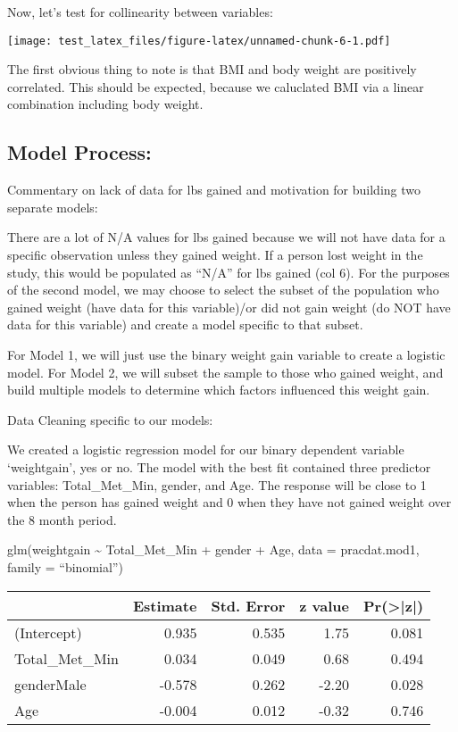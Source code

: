 \documentclass[]{article}
\begin{document}
Now, let's test for collinearity between variables:

\texttt{[image: test\_latex\_files/figure-latex/unnamed-chunk-6-1.pdf]}

The first obvious thing to note is that BMI and body weight are
positively correlated. This should be expected, because we caluclated
BMI via a linear combination including body weight.

\hypertarget{model-process}{%
\subsection{Model Process:}\label{model-process}}

Commentary on lack of data for lbs gained and motivation for building
two separate models:

There are a lot of N/A values for lbs gained because we will not have
data for a specific observation unless they gained weight. If a person
lost weight in the study, this would be populated as ``N/A'' for lbs
gained (col 6). For the purposes of the second model, we may choose to
select the subset of the population who gained weight (have data for
this variable)/or did not gain weight (do NOT have data for this
variable) and create a model specific to that subset.

For Model 1, we will just use the binary weight gain variable to create
a logistic model. For Model 2, we will subset the sample to those who
gained weight, and build multiple models to determine which factors
influenced this weight gain.

Data Cleaning specific to our models:

We created a logistic regression model for our binary dependent variable
`weightgain', yes or no. The model with the best fit contained three
predictor variables: Total\_Met\_Min, gender, and Age. The response will
be close to 1 when the person has gained weight and 0 when they have not
gained weight over the 8 month period.

glm(weightgain \textasciitilde{} Total\_Met\_Min + gender + Age, data =
pracdat.mod1, family = ``binomial'')

\begin{tabular}{l|r|r|r|r}
\hline
  & Estimate & Std. Error & z value & Pr(>|z|)\\
\hline
(Intercept) & 0.935 & 0.535 & 1.75 & 0.081\\
\hline
Total\_Met\_Min & 0.034 & 0.049 & 0.68 & 0.494\\
\hline
genderMale & -0.578 & 0.262 & -2.20 & 0.028\\
\hline
Age & -0.004 & 0.012 & -0.32 & 0.746\\
\hline
\end{tabular}
\end{document}
